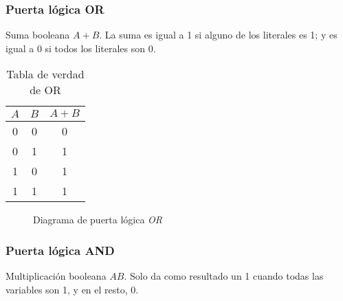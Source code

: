\documentclass[12pt]{article}
\begin{document}
            \subsubsection{\textbf{Puerta lógica OR}}
            
            Suma booleana $A + B$. La suma es igual a 1 si alguno de los literales es 1; y es igual a 0 si todos los literales son 0.

            \begin{multicols}{2}

\begin{table}[H]
    \centering
                \begin{tabular}{|c c|c}
                    $A$ & $B$ & $A + B$ \\
                    \hline
                    0 & 0 & 0 \\
                    0 & 1 & 1 \\
                    1 & 0 & 1 \\
                    1 & 1 & 1
                \end{tabular}
    \caption{Tabla de verdad de OR}
    \label{tab:my_label}
\end{table}

                                

                \columnbreak
                \newpage
                \begin{figure}[H]
                    \centering
                    
                    \caption{Diagrama de puerta lógica \textit{OR} \cite{logic_gate}}
                    \label{fig:or}
                \end{figure}

            \end{multicols}
            
            \subsubsection{\textbf{Puerta lógica AND}}
            
            Multiplicación booleana $AB$. Solo da como resultado un 1 cuando todas las variables son 1, y en el resto, 0.
            
\end{document}
